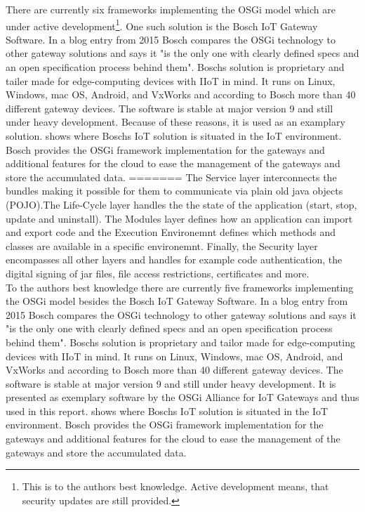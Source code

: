 There are currently six frameworks implementing the OSGi model which are under active development\footnote{This is to the authors best knowledge. Active development means, that security updates are still provided.}. One such solution is the Bosch IoT Gateway Software\cite{BoschIoT13:online}. In a blog entry from 2015 Bosch compares the OSGi technology to other gateway solutions and says it "is the only one with clearly defined specs and an open specification process behind them"\cite{boschBlogOSGi69:online}. Boschs solution is proprietary and tailer made for edge-computing devices with IIoT in mind\cite{OSGiforIoTBlog27:online}. It runs on Linux, Windows, mac OS, Android, and VxWorks and according to Bosch more than 40 different gateway devices\cite{BoschIoT13:online}. The software is stable at major version 9 and still under heavy development. Because of these reasons, it is used as an examplary solution.  shows where Boschs IoT solution is situated in the IoT environment. Bosch provides the OSGi framework implementation for the gateways and additional features for the cloud to ease the management of the gateways and store the accumulated data.
=======
The Service layer interconnects the bundles making it possible for them to communicate via plain old java objects (POJO).The Life-Cycle layer handles the the state of the application (start, stop, update and uninstall). The Modules layer defines how an application can import and export code and the Execution Environemnt defines which methods and classes are available in a specific environemnt. Finally, the Security layer encompasses all other layers and handles for example code authentication, the digital signing of jar files, file access restrictions, certificates and more.\\
To the authors best knowledge there are currently five frameworks implementing the OSGi model besides the Bosch IoT Gateway Software\cite{BoschIoT13:online}. In a blog entry from 2015 Bosch compares the OSGi technology to other gateway solutions and says it "is the only one with clearly defined specs and an open specification process behind them"\cite{boschBlogOSGi69:online}. Boschs solution is proprietary and tailor made for edge-computing devices with IIoT in mind\cite{OSGiforIoTBlog27:online}. It runs on Linux, Windows, mac OS, Android, and VxWorks and according to Bosch more than 40 different gateway devices\cite{BoschIoT13:online}. The software is stable at major version 9 and still under heavy development. It is presented as exemplary software by the OSGi Alliance for IoT Gateways \cite{exampleIoTGateweOSGi:online} and thus used in this report.  shows where Boschs IoT solution is situated in the IoT environment. Bosch provides the OSGi framework implementation for the gateways and additional features for the cloud to ease the management of the gateways and store the accumulated data.
